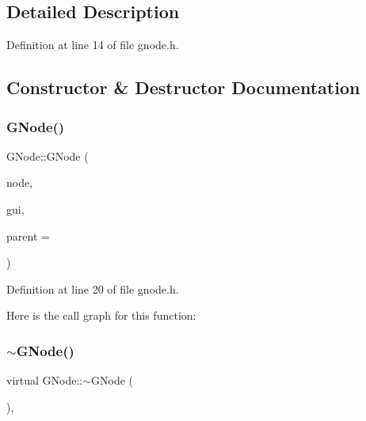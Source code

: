 \subsection{Detailed Description}


Definition at line 14 of file gnode.\+h.



\subsection{Constructor \& Destructor Documentation}
\mbox{\label{struct_g_node_a2344be00333e7e3c1e481320dab0ab6c}} 
\subsubsection{\texorpdfstring{G\+Node()}{GNode()}}
{\footnotesize\ttfamily G\+Node\+::\+G\+Node (\begin{DoxyParamCaption}\item[{\mbox{\hyperlink{class_node}{Node}} $\ast$}]{node,  }\item[{\mbox{\hyperlink{struct_node_gui_attr}{Node\+Gui\+Attr}} $\ast$}]{gui,  }\item[{Q\+Widget $\ast$}]{parent = {} }\end{DoxyParamCaption})\hspace{0.3cm}{\ttfamily [inline]}}



Definition at line 20 of file gnode.\+h.

Here is the call graph for this function\+:
\mbox{\label{struct_g_node_a126f44e9c70024d22e3766e9188858e0}} 
\subsubsection{\texorpdfstring{$\sim$\+G\+Node()}{~GNode()}}
{\footnotesize\ttfamily virtual G\+Node\+::$\sim$\+G\+Node (\begin{DoxyParamCaption}{ }\end{DoxyParamCaption})\hspace{0.3cm}{\ttfamily [inline]}, {\ttfamily [virtual]}}



